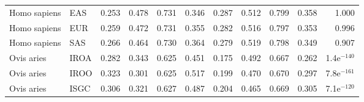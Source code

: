 \begin{center}
\begin{adjustbox}{width = 1\textwidth}
\begin{tabular}{llrrrrrrrrr}
        Homo sapiens &                       EAS &                              0.253 &                               0.478 &                 0.731 &                 0.346 &                              0.287 &                               0.512 &                 0.799 &                 0.358 &         1.000 \\
        Homo sapiens &                       EUR &                              0.259 &                               0.472 &                 0.731 &                 0.355 &                              0.282 &                               0.516 &                 0.797 &                 0.353 &         0.996 \\
        Homo sapiens &                       SAS &                              0.266 &                               0.464 &                 0.730 &                 0.364 &                              0.279 &                               0.519 &                 0.798 &                 0.349 &         0.907 \\
          Ovis aries &                      IROA &                              0.282 &                               0.343 &                 0.625 &                 0.451 &                              0.175 &                               0.492 &                 0.667 &                 0.262 & 1.4e$^{-140}$ \\
          Ovis aries &                      IROO &                              0.323 &                               0.301 &                 0.625 &                 0.517 &                              0.199 &                               0.470 &                 0.670 &                 0.297 & 7.8e$^{-161}$ \\
          Ovis aries &                      ISGC &                              0.306 &                               0.321 &                 0.627 &                 0.487 &                              0.204 &                               0.465 &                 0.669 &                 0.305 & 7.1e$^{-120}$ \\
\bottomrule
\end{tabular}
\end{adjustbox}
\end{center}
